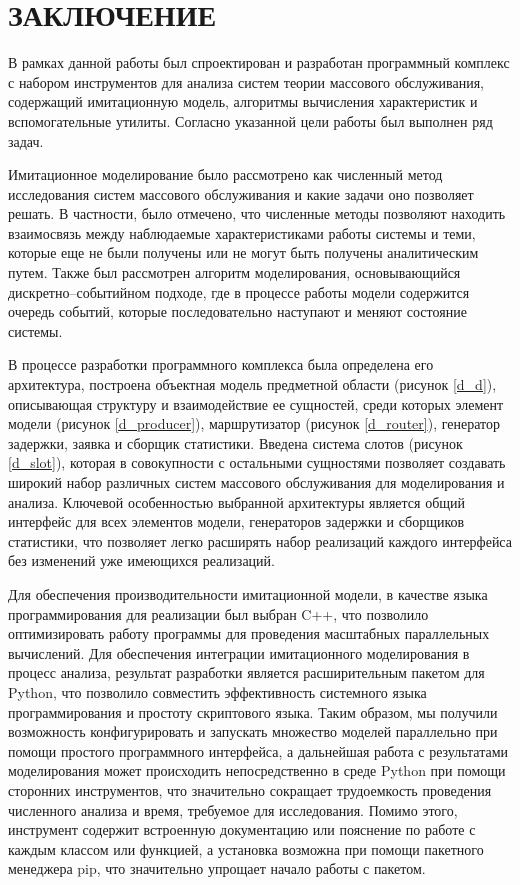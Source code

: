 \section*{\centering\normalsize ЗАКЛЮЧЕНИЕ}

В рамках данной работы был спроектирован и разработан программный комплекс с набором инструментов для анализа систем теории массового обслуживания, содержащий имитационную модель, алгоритмы вычисления характеристик и вспомогательные утилиты. Согласно указанной цели работы был выполнен ряд задач.

Имитационное моделирование было рассмотрено как численный метод исследования систем массового обслуживания и какие задачи оно позволяет решать. В частности, было отмечено, что численные методы позволяют находить взаимосвязь между наблюдаемые характеристиками работы системы и теми, которые еще не были получены или не могут быть получены аналитическим путем. Также был рассмотрен алгоритм моделирования, основывающийся дискретно--событийном подходе, где в процессе работы модели содержится очередь событий, которые последовательно наступают и меняют состояние системы. 

В процессе разработки программного комплекса была определена его архитектура, построена объектная модель предметной области (рисунок  \ref{d_d}), описывающая структуру и взаимодействие ее сущностей, среди которых элемент модели (рисунок \ref{d_producer}), маршрутизатор (рисунок \ref{d_router}), генератор задержки, заявка и сборщик статистики. Введена система слотов (рисунок \ref{d_slot}), которая в совокупности с остальными сущностями позволяет создавать широкий набор различных систем массового обслуживания для моделирования и анализа. Ключевой особенностью выбранной архитектуры является общий интерфейс для всех элементов модели, генераторов задержки и сборщиков статистики, что позволяет легко расширять набор реализаций каждого интерфейса без изменений уже имеющихся реализаций.

Для обеспечения производительности имитационной модели, в качестве языка программирования для реализации был выбран C++, что позволило оптимизировать работу программы для проведения масштабных параллельных вычислений. Для обеспечения интеграции имитационного моделирования в процесс анализа, результат разработки является расширительным пакетом для Python, что позволило совместить эффективность системного языка программирования и простоту скриптового языка. Таким образом, мы получили возможность конфигурировать и запускать множество моделей параллельно при помощи простого программного интерфейса, а дальнейшая работа с результатами моделирования может происходить непосредственно в среде Python при помощи сторонних инструментов, что значительно сокращает трудоемкость проведения численного анализа и время, требуемое для исследования. Помимо этого, инструмент содержит встроенную документацию или пояснение по работе с каждым классом или функцией, а установка возможна при помощи пакетного менеджера pip, что значительно упрощает начало работы с пакетом.

